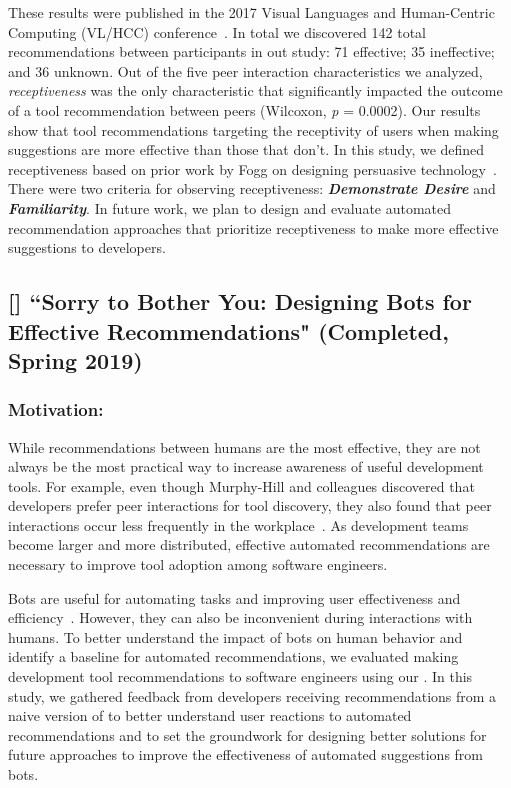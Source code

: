 These results were published in the 2017 Visual Languages and Human-Centric Computing (VL/HCC) conference~\cite{VLHCC}. In total we discovered 142 total recommendations between participants in out study: 71 effective; 35 ineffective; and 36 unknown. Out of the five peer interaction characteristics we analyzed, \textit{receptiveness} was the only characteristic that significantly impacted the outcome of a tool recommendation between peers (Wilcoxon, \textit{p} = 0.0002). Our results show that tool recommendations targeting the receptivity of users when making suggestions are more effective than those that don't. In this study, we defined receptiveness based on prior work by Fogg on designing persuasive technology~\cite{Fogg2009Persuasive}. There were two criteria for observing receptiveness: \textit{\textbf{Demonstrate Desire}} and \textit{\textbf{Familiarity}}. In future work, we plan to design and evaluate automated recommendation approaches that prioritize receptiveness to make more effective suggestions to developers.

\subsection{[\sorry] ``Sorry to Bother You: Designing Bots for
Effective Recommendations" (Completed, Spring 2019)}

\subsubsection{Motivation:}

While recommendations between humans are the most effective, they are not always be the most practical way to increase awareness of useful development tools. For example, even though Murphy-Hill and colleagues discovered that developers prefer peer interactions for tool discovery, they also found that peer interactions occur less frequently in the workplace~\cite{Murphy-Hill2011PeerInteraction}. As development teams become larger and more distributed, effective automated recommendations are necessary to improve tool adoption among software engineers.

Bots are useful for automating tasks and improving user effectiveness and efficiency~\cite{StoreyBots}. However, they can also be inconvenient during interactions with humans. To better understand the impact of bots on human behavior and identify a baseline for automated recommendations, we evaluated making development tool recommendations to software engineers using our \tele. In this study, we gathered feedback from developers receiving recommendations from a naive version of \tool to better understand user reactions to automated recommendations and to set the groundwork for designing better solutions for future approaches to improve the effectiveness of automated suggestions from bots.

